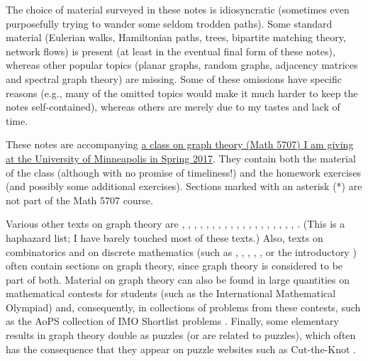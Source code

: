\documentclass[numbers=enddot,12pt,final,onecolumn,notitlepage]{scrartcl}%
\theoremstyle{definition}
\begin{document}
The choice of material surveyed in these notes is idiosyncratic
(sometimes even purposefully trying to wander some seldom trodden
paths). Some standard material (Eulerian walks, Hamiltonian paths,
trees, bipartite matching theory, network flows) is present (at least
in the eventual final form of these notes), whereas
other popular topics (planar graphs, random graphs, adjacency matrices
and spectral graph theory) are missing. Some of these omissions have
specific reasons (e.g., many of the omitted topics would make it much
harder to keep the notes self-contained), whereas others are merely
due to my tastes and lack of time.

These notes are accompanying
\href{http://www.math.umn.edu/~dgrinber/5707s17/}{a
class on graph theory (Math 5707) I am giving at the University of
Minneapolis in Spring 2017}. They contain both the
material of the class (although with no promise of timeliness!) and the
homework exercises (and possibly some additional exercises).
Sections marked with an asterisk (*) are not part of the Math 5707
course.

Various other texts on graph theory are \cite{Bollob79},
\cite{Bollob98}, \cite{Harary69}, \cite{Harju14}, \cite{Balakr97},
\cite{Jungni13}, \cite{Martin16},
\cite{BonMur76}, \cite{Ore62}, \cite{BehCha71}, \cite{BeChZh15},
\cite{BonMur08}, \cite{Ruohon13}, \cite{Dieste16}, \cite{Ore90},
\cite{HaHiMo08}, \cite{Berge91}, \cite{ChaLes15}, \cite{Griffi15},
\cite{Wilson96}.
(This is a haphazard list; I have barely touched most of these texts.)
Also, texts on combinatorics and on discrete mathematics (such as
\cite{BenWil12}, \cite{KelTro15}, \cite{PoTaWo83}, \cite{Bona11},
\cite{Guicha16},
or the introductory \cite{LoPeVe03}) often contain
sections on graph theory, since graph theory is considered to be part
of both.
Material on graph theory can also be found in large quantities on
mathematical contests for students (such as the International
Mathematical Olympiad) and, consequently, in collections of problems
from these contests, such as the AoPS collection of IMO Shortlist
problems \cite{AoPS-ISL}.
Finally, some elementary results in graph theory double as puzzles
(or are related to puzzles), which often has the consequence that they
appear on puzzle websites such as Cut-the-Knot \cite{cut-the-knot}.
\end{document}
